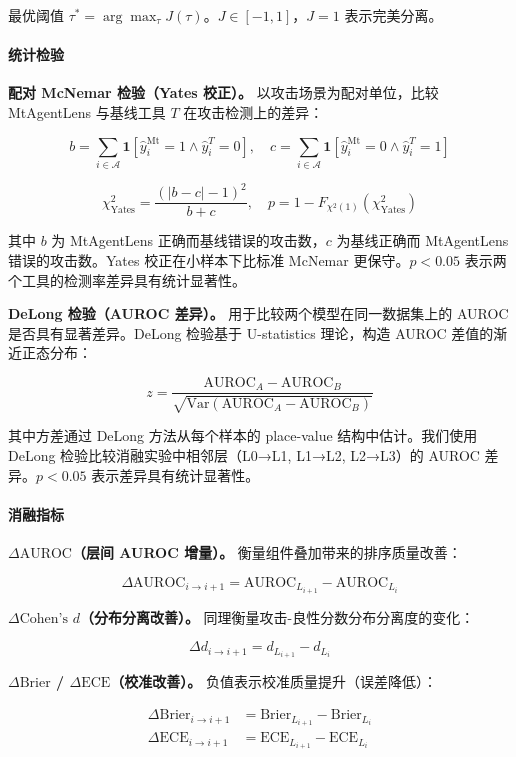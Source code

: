 \documentclass[a4paper]{ctexart}
\makeatletter
\renewcommand{\_}{%
  \ifmmode
    \nfss@text{\textunderscore}%
  \else
    \textunderscore\discretionary{}{}{}%
  \fi}
\makeatother
\begin{document}
最优阈值 $\tau^* = \arg\max_{\tau} J(\tau)$。$J \in [-1, 1]$，$J=1$ 表示完美分离。


\paragraph{统计检验}


\textbf{配对 McNemar 检验（Yates 校正）。} 以攻击场景为配对单位，比较 MtAgentLens 与基线工具 $T$ 在攻击检测上的差异：


$$
b = \sum_{i \in \mathcal{A}} \mathbf{1}[\hat{y}_i^{\text{Mt}} = 1 \land \hat{y}_i^{T} = 0], \quad
c = \sum_{i \in \mathcal{A}} \mathbf{1}[\hat{y}_i^{\text{Mt}} = 0 \land \hat{y}_i^{T} = 1]
$$


$$
\chi^2_{\text{Yates}} = \frac{(|b - c| - 1)^2}{b + c}, \quad p = 1 - F_{\chi^2(1)}(\chi^2_{\text{Yates}})
$$


其中 $b$ 为 MtAgentLens 正确而基线错误的攻击数，$c$ 为基线正确而 MtAgentLens 错误的攻击数。Yates 校正在小样本下比标准 McNemar 更保守。$p < 0.05$ 表示两个工具的检测率差异具有统计显著性。


\textbf{DeLong 检验（AUROC 差异）。} 用于比较两个模型在同一数据集上的 AUROC 是否具有显著差异。DeLong 检验基于 U-statistics 理论，构造 AUROC 差值的渐近正态分布：


$$
z = \frac{\text{AUROC}_A - \text{AUROC}_B}{\sqrt{\text{Var}(\text{AUROC}_A - \text{AUROC}_B)}}
$$


其中方差通过 DeLong 方法从每个样本的 place-value 结构中估计。我们使用 DeLong 检验比较消融实验中相邻层（L0→L1, L1→L2, L2→L3）的 AUROC 差异。$p < 0.05$ 表示差异具有统计显著性。


\paragraph{消融指标}


\textbf{$\Delta\text{AUROC}$（层间 AUROC 增量）。} 衡量组件叠加带来的排序质量改善：


$$
\Delta\text{AUROC}_{i \to i+1} = \text{AUROC}_{L_{i+1}} - \text{AUROC}_{L_i}
$$


\textbf{$\Delta\text{Cohen's } d$（分布分离改善）。} 同理衡量攻击-良性分数分布分离度的变化：


$$
\Delta d_{i \to i+1} = d_{L_{i+1}} - d_{L_i}
$$


\textbf{$\Delta\text{Brier}$ / $\Delta\text{ECE}$（校准改善）。} 负值表示校准质量提升（误差降低）：


$$
\begin{aligned}
\Delta\text{Brier}_{i \to i+1} &= \text{Brier}_{L_{i+1}} - \text{Brier}_{L_i} \\
\Delta\text{ECE}_{i \to i+1} &= \text{ECE}_{L_{i+1}} - \text{ECE}_{L_i}
\end{aligned}
$$
\end{document}
